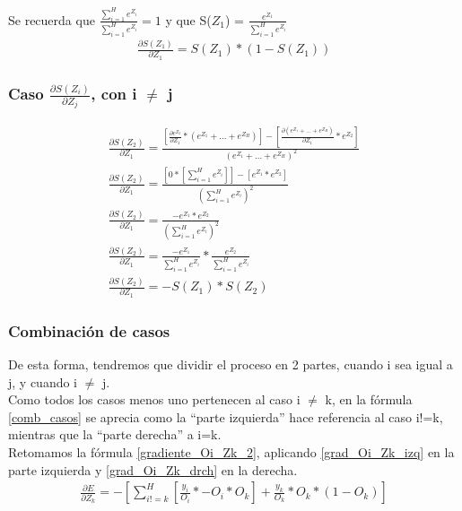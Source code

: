 Se recuerda que $\frac{\sum_{i=1}^{H}  e^{Z_i}}{\sum_{i=1}^{H}  e^{Z_i}} = 1$ y que S($Z_1$) = $ \frac{e^{Z_1}}{\sum_{i=1}^{H}  e^{Z_i}}$ \\
\begin{gather}
	\frac{\partial S(Z_1)}{\partial Z_1} = S(Z_1) * (1- S(Z_1))
	\label{grad_Oi_Zk_drch}
\end{gather}

\subsubsection{Caso $\frac{\partial S(Z_i)}{\partial Z_j}$, con i $\neq$ j}

\begin{gather}
	\frac{\partial S(Z_2)}{\partial Z_1} = \frac{[\frac{\partial e^{Z_2}}{\partial Z_1} * (e^{Z_1} + ... + e^{Z_H}) ] - [\frac{\partial (e^{Z_1} + ... + e^{Z_H})}{\partial Z_1} * e^{Z_2} ] }{(e^{Z_1} + ... + e^{Z_H})^2} \\
	\frac{\partial S(Z_2)}{\partial Z_1} = \frac{[0 * [\sum_{i=1}^{H}  e^{Z_i}]] - [e^{Z_1} * e^{Z_2}]   }{ (\sum_{i=1}^{H}  e^{Z_i})^2} \\
	\frac{\partial S(Z_2)}{\partial Z_1} = \frac{-e^{Z_1} * e^{Z_2}  }{(\sum_{i=1}^{H}  e^{Z_i})^2} \\
	\frac{\partial S(Z_2)}{\partial Z_1} = \frac{-e^{Z_1}}{\sum_{i=1}^{H}  e^{Z_i}} * \frac{e^{Z_2}}{\sum_{i=1}^{H}  e^{Z_i}} \\
	\frac{\partial S(Z_2)}{\partial Z_1} = -S(Z_1) * S(Z_2)
	\label{grad_Oi_Zk_izq}
\end{gather}

\subsubsection{Combinación de casos}

De esta forma, tendremos que dividir  el proceso en 2 partes, cuando i sea igual a j, y cuando i $\neq$ j. \\
Como todos los casos menos uno pertenecen al caso i $\neq$ k, en la fórmula \ref{comb_casos} se aprecia como la ``parte izquierda'' hace referencia al caso i!=k, mientras que la ``parte derecha'' a i=k. \\
Retomamos la fórmula \ref{gradiente_Oi_Zk_2}, aplicando \ref{grad_Oi_Zk_izq} en la parte izquierda y \ref{grad_Oi_Zk_drch} en la derecha. \\
\begin{gather}
	\frac{\partial E}{\partial Z_k} = - [\sum_{i!=k}^{H} [\frac{y_i}{O_i} * -O_i * O_k ] + \frac{y_k}{O_k} * O_k * (1 - O_k)  ]
	\label{comb_casos}
\end{gather}

